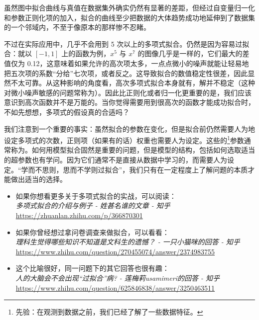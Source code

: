 虽然图中拟合曲线与真值在数据集外确实仍然有显著的差距，但经过自变量归一化和参数正则化项的加入，拟合的曲线至少把数据的大体趋势成功地延伸到了数据集的一个邻域内，不至于像原本的那样惨不忍睹。

不过在实际应用中，几乎不会用到 5 次以上的多项式拟合。仍然是因为容易过拟合：就以 $[-1, 1]$ 上的函数为例，$x^5$ 与 $x^7$ 的图像几乎是一样的，它们最大的差值仅为 0.12，这意味着如果允许的高次项太多，一点点微小的噪声就能让轻易地把五次项的系数“分给”七次项，或者反之。这导致拟合的数值稳定性很差，因此显然不太可靠。从这种影响的角度看，高次多项式拟合本身就有，解并不稳定（这种对微小噪声敏感的问题常称为）。因此比正则化或者归一化更重要的是，我们应该意识到高次函数并不是万能的。当你觉得需要用到很高次的函数才能成功拟合时，不如先想想，多项式的假设真的合适吗？

我们注意到一个重要的事实：虽然拟合的参数在变化，但是拟合前仍然需要人为地设定多项式的次数，正则项（如果有的话）权重也需要人为设定。这些的\footnote{先验：在观测到数据之前，我们已经了解了一些数据特征。}参数通常称为。如何用模型拟合固然是重要的问题，但是模型的结构，包括如何选取适当的超参数也有学问。因为它们通常不是直接从数据中学习的，而需要人为设定。“学而不思则，思而不学则过拟合”，我们只有在一定程度上了解问题的本质才能做出适当的选择。

\begin{tcolorbox}[myrecommendbox, title=推荐阅读, breakable=false]
    \begin{itemize}
        \item 如果你想看更多关于多项式拟合的实战，可以阅读：\\
              \textit{多项式拟合的介绍与例子 - 姓甚名谁的文章 - 知乎}\\
              \url{https://zhuanlan.zhihu.com/p/366870301}
        \item 如果你曾经想过拿问卷调查来做拟合，可以看看：\\
              \textit{理科生觉得哪些知识不知道是文科生的遗憾？ - 一只小猫咪的回答 - 知乎}\\
              \url{https://www.zhihu.com/question/270455074/answer/2374983755}
        \item 这个比喻很好，同一问题下的其它回答也很有趣：\\
              \textit{人的大脑会不会出现“过拟合”病? - 莲梅莉usamimeri的回答 - 知乎}\\
              \url{https://www.zhihu.com/question/625846838/answer/3250463511}
    \end{itemize}
\end{tcolorbox}

